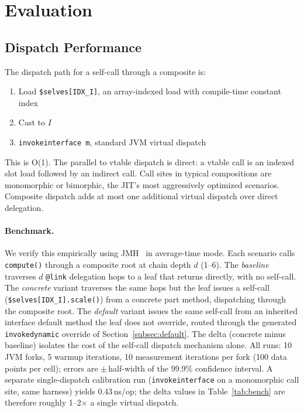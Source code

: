 \documentclass[acmsmall,nonacm]{acmart}
\theoremstyle{acmplain}
\theoremstyle{acmdefinition}
\newcommand{\code}[1]{\texttt{#1}}
\begin{document}
\section{Evaluation}
\label{sec:eval}

\subsection{Dispatch Performance}

The dispatch path for a self-call through a composite is:
\begin{enumerate}
  \item Load \code{\$selves[IDX\_I]}, an array-indexed load with compile-time
        constant index
  \item Cast to $I$
  \item \code{invokeinterface m}, standard JVM virtual dispatch
\end{enumerate}

This is O(1). The parallel to vtable dispatch is direct: a vtable
call is an indexed slot load followed by an indirect call. Call sites in typical
compositions are monomorphic or bimorphic, the JIT's most aggressively optimized
scenarios. Composite dispatch adds at most one additional virtual dispatch over
direct delegation.

\paragraph{Benchmark.}
We verify this empirically using JMH~\cite{jmh} in average-time mode.
Each scenario calls \code{compute()} through a composite root at chain
depth $d$ (1--6). The \emph{baseline} traverses $d$ \code{@link} delegation
hops to a leaf that returns directly, with no self-call. The \emph{concrete}
variant traverses the same hops but the leaf issues a self-call
(\code{\$selves[IDX\_I].scale()}) from a concrete part method,
dispatching through the composite root. The \emph{default} variant issues the
same self-call from an inherited interface default method the leaf does not
override, routed through the generated \code{invokedynamic} override of
Section~\ref{subsec:default}. The delta (concrete minus baseline) isolates the cost of the self-call
dispatch mechanism alone. All runs: 10 JVM forks,
5 warmup iterations, 10 measurement iterations per fork (100 data points per
cell); errors are $\pm$\,half-width of the 99.9\% confidence interval.
A separate single-dispatch calibration run (\code{invokeinterface}
on a monomorphic call site, same harness) yields 0.43\,ns/op; the delta
values in Table~\ref{tab:bench} are therefore roughly 1--2$\times$ a single virtual
dispatch.
\end{document}
